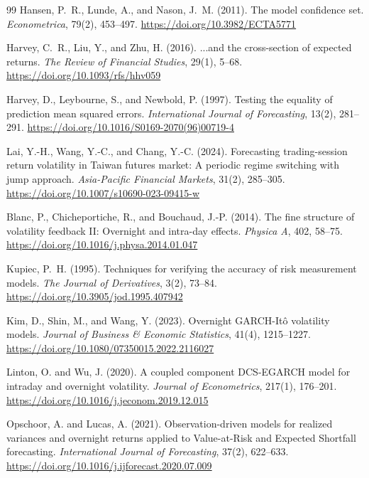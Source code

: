 \documentclass[11pt,a4paper]{article}
\begin{document}
\begin{thebibliography}{99}
Hansen, P.~R., Lunde, A., and Nason, J.~M. (2011).
\newblock The model confidence set.
\newblock \emph{Econometrica}, 79(2), 453--497.
\newblock \url{https://doi.org/10.3982/ECTA5771}

Harvey, C.~R., Liu, Y., and Zhu, H. (2016).
\newblock ...and the cross-section of expected returns.
\newblock \emph{The Review of Financial Studies}, 29(1), 5--68.
\newblock \url{https://doi.org/10.1093/rfs/hhv059}

Harvey, D., Leybourne, S., and Newbold, P. (1997).
\newblock Testing the equality of prediction mean squared errors.
\newblock \emph{International Journal of Forecasting}, 13(2), 281--291.
\newblock \url{https://doi.org/10.1016/S0169-2070(96)00719-4}

Lai, Y.-H., Wang, Y.-C., and Chang, Y.-C. (2024).
\newblock Forecasting trading-session return volatility in Taiwan futures market:
A periodic regime switching with jump approach.
\newblock \emph{Asia-Pacific Financial Markets}, 31(2), 285--305.
\newblock \url{https://doi.org/10.1007/s10690-023-09415-w}

Blanc, P., Chicheportiche, R., and Bouchaud, J.-P. (2014).
\newblock The fine structure of volatility feedback II: Overnight and intra-day effects.
\newblock \emph{Physica A}, 402, 58--75.
\newblock \url{https://doi.org/10.1016/j.physa.2014.01.047}

Kupiec, P.~H. (1995).
\newblock Techniques for verifying the accuracy of risk measurement models.
\newblock \emph{The Journal of Derivatives}, 3(2), 73--84.
\newblock \url{https://doi.org/10.3905/jod.1995.407942}

Kim, D., Shin, M., and Wang, Y. (2023).
\newblock Overnight GARCH-It\^{o} volatility models.
\newblock \emph{Journal of Business \& Economic Statistics}, 41(4), 1215--1227.
\newblock \url{https://doi.org/10.1080/07350015.2022.2116027}

Linton, O. and Wu, J. (2020).
\newblock A coupled component DCS-EGARCH model for intraday and overnight volatility.
\newblock \emph{Journal of Econometrics}, 217(1), 176--201.
\newblock \url{https://doi.org/10.1016/j.jeconom.2019.12.015}

Opschoor, A. and Lucas, A. (2021).
\newblock Observation-driven models for realized variances and overnight returns applied to Value-at-Risk and Expected Shortfall forecasting.
\newblock \emph{International Journal of Forecasting}, 37(2), 622--633.
\newblock \url{https://doi.org/10.1016/j.ijforecast.2020.07.009}


\end{thebibliography}
\end{document}
